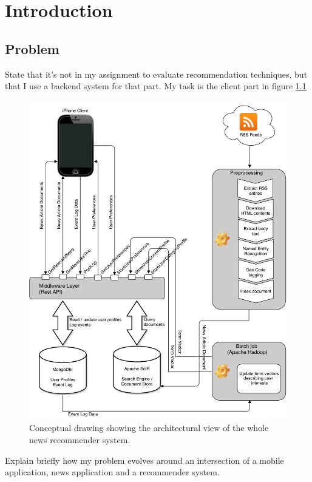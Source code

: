 \chapter{Introduction}


\section{Problem}

State that it's not in my assignment to evaluate recommendation techniques, but that I use a backend system for that part. My task is the client part in figure \ref{tech_news_app_architectural_view}

\begin{figure}[!htbp]
\centering
\includegraphics[width=130mm]{GFX/tech/newsAppArchitecture.png}
\caption{Conceptual drawing showing the architectural view of the whole news recommender system.}
\label{tech_news_app_architectural_view}
\end{figure}

Explain briefly how my problem evolves around an intersection of a mobile application, news application and a recommender system.


